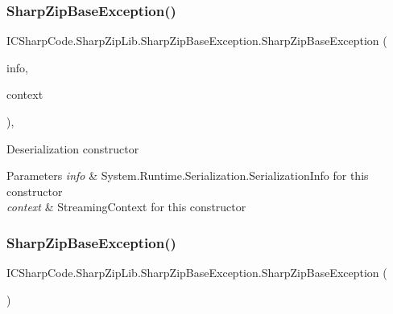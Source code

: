 \subsubsection{\texorpdfstring{Sharp\+Zip\+Base\+Exception()}{SharpZipBaseException()}\hspace{0.1cm}{\footnotesize\ttfamily [5/8]}}
{\footnotesize\ttfamily I\+C\+Sharp\+Code.\+Sharp\+Zip\+Lib.\+Sharp\+Zip\+Base\+Exception.\+Sharp\+Zip\+Base\+Exception (\begin{DoxyParamCaption}\item[{Serialization\+Info}]{info,  }\item[{Streaming\+Context}]{context }\end{DoxyParamCaption})\hspace{0.3cm}{\ttfamily [inline]}, {\ttfamily [protected]}}



Deserialization constructor 


\begin{DoxyParams}{Parameters}
{\em info} & System.\+Runtime.\+Serialization.\+Serialization\+Info for this constructor\\
\hline
{\em context} & Streaming\+Context for this constructor\\
\hline
\end{DoxyParams}
\mbox{\label{class_i_c_sharp_code_1_1_sharp_zip_lib_1_1_sharp_zip_base_exception_a9f3a4dc4d0a64f39aac7fa7705c0e497}} 
\subsubsection{\texorpdfstring{Sharp\+Zip\+Base\+Exception()}{SharpZipBaseException()}\hspace{0.1cm}{\footnotesize\ttfamily [6/8]}}
{\footnotesize\ttfamily I\+C\+Sharp\+Code.\+Sharp\+Zip\+Lib.\+Sharp\+Zip\+Base\+Exception.\+Sharp\+Zip\+Base\+Exception (\begin{DoxyParamCaption}{ }\end{DoxyParamCaption})\hspace{0.3cm}{\ttfamily [inline]}}



